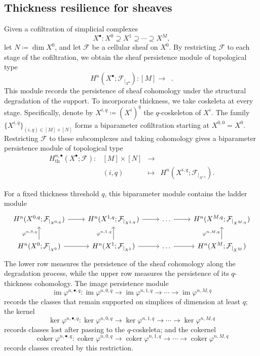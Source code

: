 \documentclass[reqno,12pt]{amsart}
\newcommand{\cF}{{\mathcal F}}
\DeclareMathOperator{\vect}{\mathbf{vect}_\Bbbk}
\DeclareMathOperator{\img}{im}
\DeclareMathOperator{\coker}{coker}
\newcommand{\0}{\mathbf 0}
\theoremstyle{definition}
\begin{document}
\subsection{Thickness resilience for sheaves} Given a cofiltration of simplicial complexes
\[    X^{\bullet}\colon
    X^0\supseteq X^1\supseteq\cdots\supseteq X^M,
\]
let $N\coloneqq\dim X^0$, and let $\cF$ be a cellular sheaf on $X^0$. By restricting $\cF$ to each stage of the cofiltration, we obtain the sheaf persistence module of topological type
\[
    H^n(X^\bullet;\cF_{|_{X^\bullet}})
    \colon [M]\longrightarrow\vect.
\]
This module records the persistence of sheaf cohomology under the structural degradation of the support. To incorporate thickness, we take coskeleta at every stage. Specifically, denote by $X^{i,q}\coloneqq (X^i)^q$ the $q$-coskeleton of $X^i$. The family $\{X^{i,q}\}_{(i,q)\in [M]\times [N]}$ forms a biparameter cofiltration starting at $X^{0,0}=X^0$. Restricting $\cF$ to these subcomplexes and taking cohomology gives a biparameter persistence module of topological type
\[
\begin{array}{lccl}
    H^{n,\bullet}_{\mathrm{th}}(X^\bullet;\cF) \colon &[M]\times [N]& \longrightarrow&\vect \\
    &(i,q)& \longmapsto&
    H^n(X^{i,q};\cF_{|_{X^{i,q}}}).
\end{array}
\]

For a fixed thickness threshold $q$, this biparameter module contains the ladder module
\[
\begin{tikzcd}
H^n(X^{0,q};\mathcal{F}_{|_{X^{0,q}}}) \arrow[r] 
& H^n(X^{1,q};\mathcal{F}_{|_{X^{1,q}}}) \arrow[r] 
& \dots \arrow[r] 
& H^n(X^{M,q};\mathcal{F}_{|_{X^{M,q}}}) \\
H^n(X^0;\mathcal{F}_{|_{X^0}}) \arrow[u, "\varphi^{n,0,q}"] \arrow[r] 
& H^n(X^1;\mathcal{F}_{|_{X^1}}) \arrow[u,"\varphi^{n,1,q}"] \arrow[r]
& \dots \arrow[r] 
& H^n(X^M;\mathcal{F}_{|_{X^M}}) \arrow[u, "\varphi^{n,M,q}"]
\end{tikzcd}
\]
The lower row measures the persistence of the sheaf cohomology along the degradation process, while the upper row measures the persistence of its $q$-thickness cohomology. The image persistence module
\begin{equation*}
        \img \varphi^{n,\bullet,q} \colon \img \varphi^{n,0,q} \to \img \varphi^{n,1,q} \to \cdots \to \img \varphi^{n,M,q}
    \end{equation*}
records the classes that remain supported on simplices of dimension at least $q$; the kernel 
 \begin{equation*}
        \ker \varphi^{n,\bullet,q} \colon \ker \varphi^{n,0,q} \to \ker \varphi^{n,1,q} \to \cdots \to \ker \varphi^{n,M,q}
    \end{equation*}
records classes lost after passing to the $q$-coskeleta; and the cokernel 
\begin{equation*}
        \coker \varphi^{n,\bullet,q} \colon \coker \varphi^{n,0,q} \to \coker \varphi^{n,1,q} \to \cdots \to \coker \varphi^{n,M,q}
  \end{equation*}
records classes created by this restriction.
\end{document}
